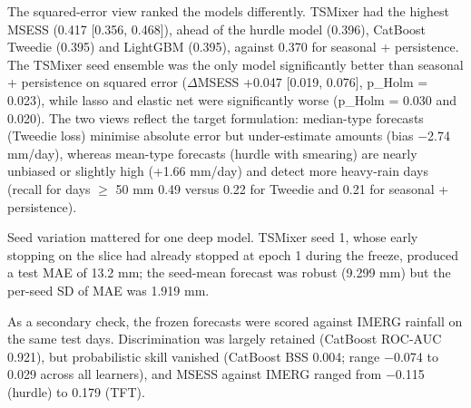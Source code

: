 \documentclass[
]{article}
\begin{document}
The squared-error view ranked the models differently. TSMixer had the highest MSESS (0.417 {[}0.356, 0.468{]}), ahead of the hurdle model (0.396), CatBoost Tweedie (0.395) and LightGBM (0.395), against 0.370 for seasonal + persistence.  %
The TSMixer seed ensemble was the only model significantly better than seasonal + persistence on squared error ($\Delta$MSESS +0.047 {[}0.019, 0.076{]}, p\_Holm = 0.023), while lasso and elastic net were significantly worse (p\_Holm = 0.030 and 0.020).  %
The two views reflect the target formulation: median-type forecasts (Tweedie loss) minimise absolute error but under-estimate amounts (bias $-$2.74 mm/day), whereas mean-type forecasts (hurdle with smearing) are nearly unbiased or slightly high (+1.66 mm/day) and detect more heavy-rain days (recall for days $\ge$ 50 mm 0.49 versus 0.22 for Tweedie and 0.21 for seasonal + persistence).  %

Seed variation mattered for one deep model. TSMixer seed 1, whose early stopping on the slice had already stopped at epoch 1 during the freeze, produced a test MAE of 13.2 mm; the seed-mean forecast was robust (9.299 mm) but the per-seed SD of MAE was 1.919 mm.  %

As a secondary check, the frozen forecasts were scored against IMERG rainfall on the same test days. Discrimination was largely retained (CatBoost ROC-AUC 0.921), but probabilistic skill vanished (CatBoost BSS 0.004; range $-$0.074 to 0.029 across all learners), and MSESS against IMERG ranged from $-$0.115 (hurdle) to 0.179 (TFT).  %
\end{document}
